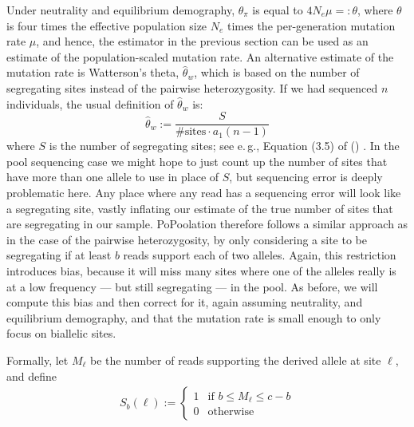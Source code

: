 \documentclass[letterpaper,fontsize=9pt,DIV=12]{scrartcl}
\newcommand\citeay[1]{\citeauthor{#1} (\citeyear{#1}) \cite{#1}}
\newcommand{\readdepth}{c}
\begin{document}


Under neutrality and equilibrium demography, $\theta_\pi$ is equal to $4N_e\mu =: \theta$, where $\theta$ is four times the effective population size $N_e$ times the per-generation mutation rate $\mu$, and hence, the estimator in the previous section can be used as an estimate of the population-scaled mutation rate.  An alternative estimate of the mutation rate is Watterson's theta, $\widehat{\theta}_w$, which is based on the number of segregating sites instead of the pairwise heterozygosity.  If we had sequenced $n$ individuals, the usual definition of $\widehat{\theta}_w$ is:
\[
\widehat{\theta}_w := \frac{S}{\text{\# sites} \cdot a_1(n-1) }
\]
where $S$ is the number of segregating sites; see e.\,g., Equation (3.5) of \citeay{Hahn2018}. In the pool sequencing case we might hope to just count up the number of sites that have more than one allele to use in place of $S$, but sequencing error is deeply problematic here.  Any place where any read has a sequencing error will look like a segregating site, vastly inflating our estimate of the true number of sites that are segregating in our sample.  PoPoolation therefore follows a similar approach as in the case of the pairwise heterozygosity, by only considering a site to be segregating if at least $b$ reads support each of two alleles.  Again, this restriction introduces bias, because it will miss many sites where one of the alleles really is at a low frequency --- but still segregating --- in the pool.  As before, we will compute this bias and then correct for it, again assuming neutrality, and equilibrium demography, and that the mutation rate is small enough to only focus on biallelic sites.


Formally, let $M_\ell$ be the number of reads supporting the derived allele at site $\ell$, and define
\begin{align}
    S_b(\ell) :=
    \begin{cases}
        1 & \text{if } b \le M_\ell \le \readdepth-b
        \\
        0 & \text{otherwise}
    \end{cases}
\end{align}
%
\end{document}
